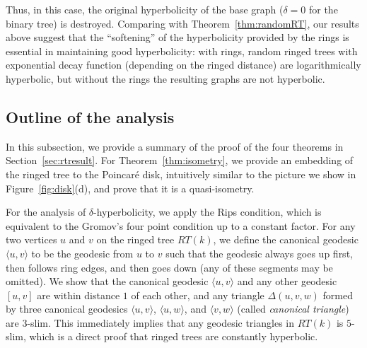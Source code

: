 \documentclass[11pt]{article}
\begin{document}
\noindent
Thus, in this case, the original hyperbolicity of the base graph 
($\delta=0$ for the binary tree) is destroyed.
Comparing with Theorem~\ref{thm:randomRT}, 
	our results above suggest that the ``softening'' of the hyperbolicity 
provided by the rings is essential in maintaining
	good hyperbolicity: with rings, random ringed trees with
	exponential decay function (depending on the ringed distance) are logarithmically hyperbolic, but
	without the rings %
	the resulting graphs are not hyperbolic.



\subsection{Outline of the analysis} 
\label{sec:rtoutline}

In this subsection, we provide a summary of the proof of the four theorems 
in Section~\ref{sec:rtresult}.
For Theorem~\ref{thm:isometry}, we provide an embedding of the ringed tree
	to the Poincar\'{e} disk, intuitively similar to the picture we show
	in Figure~\ref{fig:disk}(d), and prove that it is a quasi-isometry.

For the analysis of $\delta$-hyperbolicity, we apply the Rips condition,
	which is equivalent to the Gromov's four point condition
	up to a constant factor. 
For any two vertices $u$ and $v$ on the ringed tree $RT(k)$, we define
	the canonical geodesic $\langle u, v \rangle$ to be the geodesic from
	$u$ to $v$ such that the geodesic always goes up first, then follows ring
	edges, and then goes down (any of these segments may be omitted).
We show that the canonical geodesic $\langle u, v \rangle$ and any other
	geodesic $[u,v]$ are within distance $1$ of each other, and 
	any triangle $\Delta(u,v,w)$ formed by three canonical geodesics
	$\langle u, v \rangle$, $\langle u, w \rangle$, and $\langle v, w \rangle$
	(called {\em canonical triangle}) are $3$-slim.
This immediately implies that any geodesic triangles in $RT(k)$ is
	$5$-slim, which is a direct proof that ringed trees are constantly
	hyperbolic.
\end{document}
